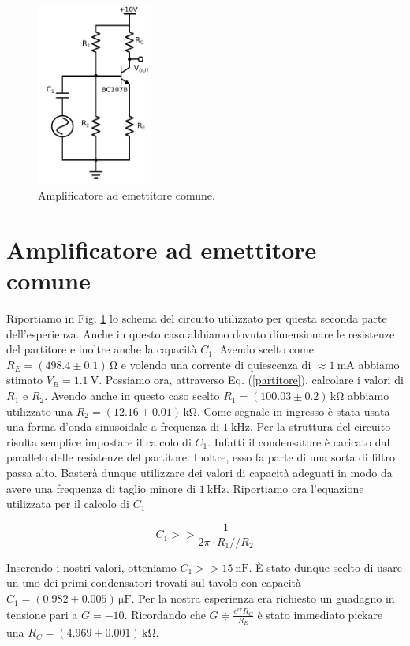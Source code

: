 \begin{figure}
	\includegraphics[width=38mm]{cc2.pdf}
	\caption{Amplificatore ad emettitore comune.}
	\label{fig:cc2}
\end{figure}

\section{Amplificatore ad emettitore comune}

Riportiamo in Fig. \ref{fig:cc2} lo schema del circuito utilizzato per questa seconda parte dell'esperienza.
Anche in questo caso abbiamo dovuto dimensionare le resistenze del partitore e inoltre anche la capacità $C_1$.
Avendo scelto come $R_E=(498.4\pm0.1)\,\si{\ohm}$ e volendo una corrente di quiescenza di $\approx \SI{1}{\milli\ampere}$ abbiamo stimato $V_B=\SI{1.1}{\volt}$.
Possiamo ora, attraverso Eq. (\ref{partitore}), calcolare i valori di $R_1$ e $R_2$.
Avendo anche in questo caso scelto $R_1=(100.03\pm0.2)\,\si{\kilo\ohm}$ abbiamo utilizzato una $R_2=(12.16\pm0.01)\,\si{\kilo\ohm}$.
Come segnale in ingresso è stata usata una forma d'onda sinusoidale a frequenza di $\SI{1}{\kilo\hertz}$.
Per la struttura del circuito risulta semplice impostare il calcolo di $C_1$.
Infatti il condensatore è caricato dal parallelo delle resistenze del partitore.
Inoltre, esso fa parte di una sorta di filtro passa alto.
Basterà dunque utilizzare dei valori di capacità adeguati in modo da avere una frequenza di taglio minore di $\SI{1}{\kilo\hertz}$.
Riportiamo ora l'equazione utilizzata per il calcolo di $C_1$

\begin{equation}
C_1>>\frac{1}{2 \pi \cdot R_1 // R_2}
\end{equation}

Inserendo i nostri valori, otteniamo $C_1>>\SI{15}{\nano\farad}$.
È stato dunque scelto di usare un uno dei primi condensatori trovati sul tavolo con capacità $C_1=(0.982\pm0.005)\,\si{\micro\farad}$.
Per la nostra esperienza era richiesto un guadagno in tensione pari a $G=-10$.
Ricordando che $G\doteqdot \frac{e^{i\pi}R_C}{R_E}$ è stato immediato pickare una $R_C=(4.969\pm0.001)\,\si{\kilo\ohm}$. 

